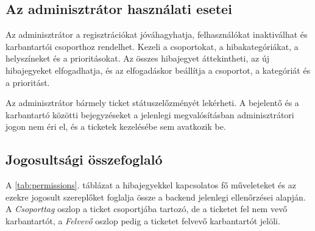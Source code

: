 \documentclass[12pt, a4paper, twoside]{article}
\begin{document}
\subsection{Az adminisztrátor használati esetei}

Az adminisztrátor a regisztrációkat jóváhagyhatja, felhasználókat inaktiválhat és karbantartói csoporthoz rendelhet. Kezeli a csoportokat, a hibakategóriákat, a helyszíneket és a prioritásokat. Az összes hibajegyet áttekintheti, az új hibajegyeket elfogadhatja, és az elfogadáskor beállítja a csoportot, a kategóriát és a prioritást.

Az adminisztrátor bármely ticket státuszelőzményét lekérheti. A bejelentő és a karbantartó közötti bejegyzéseket a jelenlegi megvalósításban adminisztrátori jogon nem éri el, és a ticketek kezelésébe sem avatkozik be.

\subsection{Jogosultsági összefoglaló}

A \ref{tab:permissions}. táblázat a hibajegyekkel kapcsolatos fő műveleteket és az ezekre jogosult szereplőket foglalja össze a backend jelenlegi ellenőrzései alapján. A \textit{Csoporttag} oszlop a ticket csoportjába tartozó, de a ticketet fel nem vevő karbantartót, a \textit{Felvevő} oszlop pedig a ticketet felvevő karbantartót jelöli.
\end{document}
